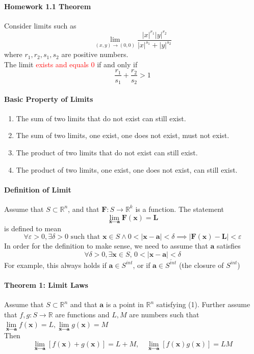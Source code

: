 \documentclass[11pt]{article}
\newcommand{\tb}[1]{\textbf{#1}}
\newcommand{\real}[0]{\mathbb{R}}
\newcommand{\vx}[0]{\tb{x}}
\newcommand{\va}[0]{\tb{a}}
\newcommand{\vf}[0]{\tb{F}}
\newcommand{\vL}[0]{\tb{L}}
\newcommand{\lima}{\underset{\vx \rightarrow \va}{\lim}}
\begin{document}
\paragraph{Homework 1.1 Theorem}
Consider limits such as
$$ \underset{(x,y) \rightarrow (0,0)}{\lim}\frac{|x|^{r_1}|y|^{r_2}}{|x|^{s_1} + |y|^{s_2}} $$
where $r_1, r_2, s_1, s_2$ are positive numbers.\\
The limit \textcolor{red}{exists and equals 0} if and only if $$\frac{r_1}{s_1} + \frac{r_2}{s_2} > 1$$
\paragraph{Basic Property of Limits}
\begin{enumerate}
	\item The sum of two limits that do not exist can still exist.
	\item The sum of two limits, one exist, one does not exist, must not exist.
	\item The product of two limits that do not exist can still exist.
	\item The product of two limits, one exist, one does not exist, can still exist.
\end{enumerate}


\paragraph{Definition of Limit}
Assume that $S \subset \real^n$, and that $\vf: S \rightarrow \real^k$ is a function. The statement
$$\underset{\vx \rightarrow \va}{\lim} \vf(\vx) = \vL$$
is defined to mean
$$\forall \varepsilon>0, \exists \delta > 0 \mbox{ such that } \vx \in S \wedge 0<|\vx - \va| < \delta \implies |\vf(\vx) - \vL| < \varepsilon$$
In order for the definition to make sense, we need to assume that $\va$ satisfies
\begin{equation}
	\forall \delta > 0, \exists \vx \in S, \,0 < |\vx - \va| < \delta
\end{equation}
For example, this always holds if $\va \in S^{int}$, or if $\va \in \overline{S^{int}}$ (the closure of $S^{int}$)
\paragraph{Theorem 1: Limit Laws}
Assume that $S \subset \real^n$ and that $\va$ is a point in $\real^n$ satisfying (1). Further assume that $f, g: S \rightarrow \real$ are functions and $L, M$ are numbers such that $\underset{\vx \rightarrow \va}{\lim} f(\vx) = L, \underset{\vx \rightarrow \va}{\lim} g(\vx) = M$ \\
Then
$$\lima[f(\vx) + g(\vx)] = L + M, \quad
\lima [f(\vx)g(\vx)] = LM$$
\end{document}
